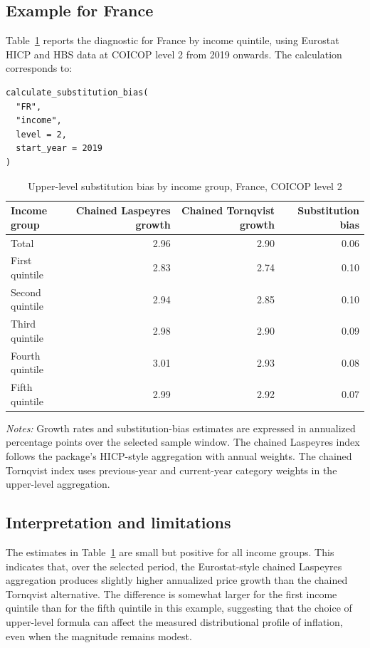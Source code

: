 \subsection{Example for France}

Table~\ref{tab:fr-substitution-bias} reports the diagnostic for France by
income quintile, using Eurostat HICP and HBS data at COICOP level 2 from 2019
onwards. The calculation corresponds to:

\begin{verbatim}
calculate_substitution_bias(
  "FR",
  "income",
  level = 2,
  start_year = 2019
)
\end{verbatim}

\begin{table}[htbp]
\centering
\caption{Upper-level substitution bias by income group, France, COICOP level 2}
\label{tab:fr-substitution-bias}
\begin{tabular}{lrrr}
\hline
Income group & Chained Laspeyres growth & Chained Tornqvist growth & Substitution bias \\
\hline
Total & 2.96 & 2.90 & 0.06 \\
First quintile & 2.83 & 2.74 & 0.10 \\
Second quintile & 2.94 & 2.85 & 0.10 \\
Third quintile & 2.98 & 2.90 & 0.09 \\
Fourth quintile & 3.01 & 2.93 & 0.08 \\
Fifth quintile & 2.99 & 2.92 & 0.07 \\
\hline
\end{tabular}
\begin{minipage}{0.9\textwidth}
\footnotesize
\emph{Notes:} Growth rates and substitution-bias estimates are expressed in
annualized percentage points over the selected sample window. The chained
Laspeyres index follows the package's HICP-style aggregation with annual
weights. The chained Tornqvist index uses previous-year and current-year
category weights in the upper-level aggregation.
\end{minipage}
\end{table}

\subsection{Interpretation and limitations}

The estimates in Table~\ref{tab:fr-substitution-bias} are small but positive
for all income groups. This indicates that, over the selected period, the
Eurostat-style chained Laspeyres aggregation produces slightly higher
annualized price growth than the chained Tornqvist alternative. The difference
is somewhat larger for the first income quintile than for the fifth quintile in
this example, suggesting that the choice of upper-level formula can affect the
measured distributional profile of inflation, even when the magnitude remains
modest.

